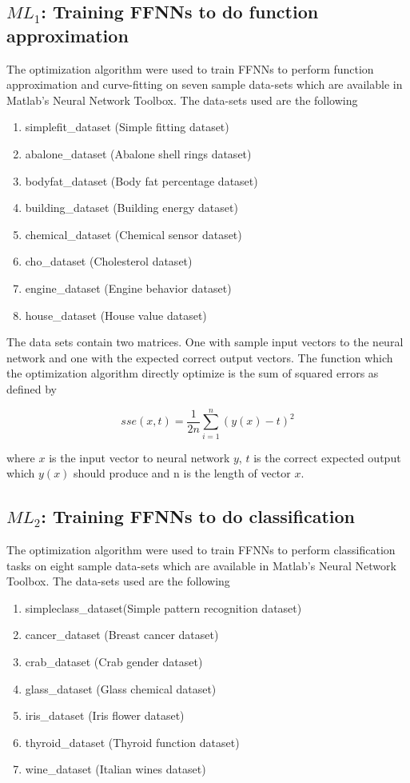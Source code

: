 \subsection{$ML_{1}$: Training FFNNs to do function approximation}

The optimization algorithm were used to train FFNNs to perform function approximation and curve-fitting on seven sample data-sets which are available in Matlab's Neural Network Toolbox. The data-sets used are the following

\begin{enumerate}
  \item simplefit\_dataset (Simple fitting dataset)
  \item abalone\_dataset (Abalone shell rings dataset)
  \item bodyfat\_dataset (Body fat percentage dataset)
  \item building\_dataset (Building energy dataset)
  \item chemical\_dataset (Chemical sensor dataset)
  \item cho\_dataset (Cholesterol dataset)
  \item engine\_dataset (Engine behavior dataset)
  \item house\_dataset (House value dataset)
\end{enumerate}

The data sets contain two matrices. One with sample input vectors to the neural network and one with the expected correct output vectors. The function which the optimization algorithm directly optimize is the sum of squared errors as defined by

\begin{equation}
  sse(x,t) = \frac{1}{2n} \sum_{i=1}^{n}{(y(x)-t)^2}
\end{equation}

where $x$ is the input vector to neural network $y$, $t$ is the correct expected output which $y(x)$ should produce and n is the length of vector $x$.

\subsection{$ML_{2}$: Training FFNNs to do classification}

The optimization algorithm were used to train FFNNs to perform classification tasks on eight sample data-sets which are available in Matlab's Neural Network Toolbox. The data-sets used are the following

\begin{enumerate}
  \item simpleclass\_dataset(Simple pattern recognition dataset)
  \item cancer\_dataset (Breast cancer dataset)
  \item crab\_dataset (Crab gender dataset)
  \item glass\_dataset (Glass chemical dataset)
  \item iris\_dataset (Iris flower dataset)
  \item thyroid\_dataset (Thyroid function dataset)
  \item wine\_dataset (Italian wines dataset)
\end{enumerate}

